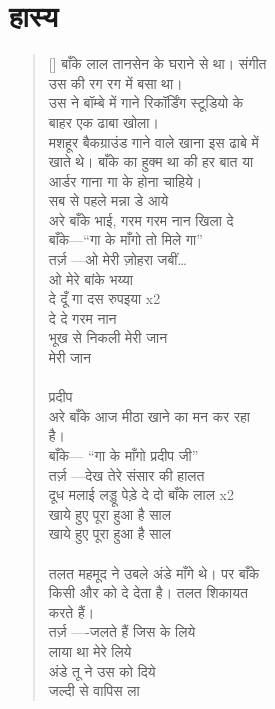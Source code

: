 
\chapter{\texthindi{हास्य
}}

\begin{verse}[\versewidth]\texthindi{
बाँके लाल तानसेन के घराने से था। संगीत\\
उस की रग रग में बसा था।\\
उस ने बॉम्बे में गाने रिकॉर्डिंग स्टूडियो के\\
बाहर एक ढाबा खोला।\\
मशहूर बैकग्राउंड गाने वाले खाना इस ढाबे में\\
खाते थे। बाँके का हुक्म था की हर बात या\\
आर्डर गाना गा के होना चाहिये।\\
सब से पहले मन्ना डे आये\\
अरे बाँके भाई, गरम गरम नान खिला दे\\
बाँके—“गा के माँगो तो मिले गा”\\
तर्ज़ —ओ मेरी ज़ोहरा जबीं…\\
ओ मेरे बांके भय्या\\
दे दूँ गा दस रुपइया x2\\
दे दे गरम नान\\
भूख से निकली मेरी जान\\
मेरी जान\\
\\
प्रदीप\\
अरे बाँके आज मीठा खाने का मन कर रहा\\
है।\\
बाँके— “गा के माँगो प्रदीप जी”\\
तर्ज़ —देख तेरे संसार की हालत\\
दूध मलाई लड्डू पेड़े दे दो बाँके लाल x2\\
खाये हुए पूरा हुआ है साल\\
खाये हुए पूरा हुआ है साल\\
\\
तलत महमूद ने उबले अंडे माँगे थे। पर बाँके\\
किसी और को दे देता है। तलत शिकायत\\
करते हैं।\\
तर्ज़ —-जलते हैं जिस के लिये\\
लाया था मेरे लिये\\
अंडे तू ने उस को दिये\\
जल्दी से वापिस ला\\
}
\end{verse}
